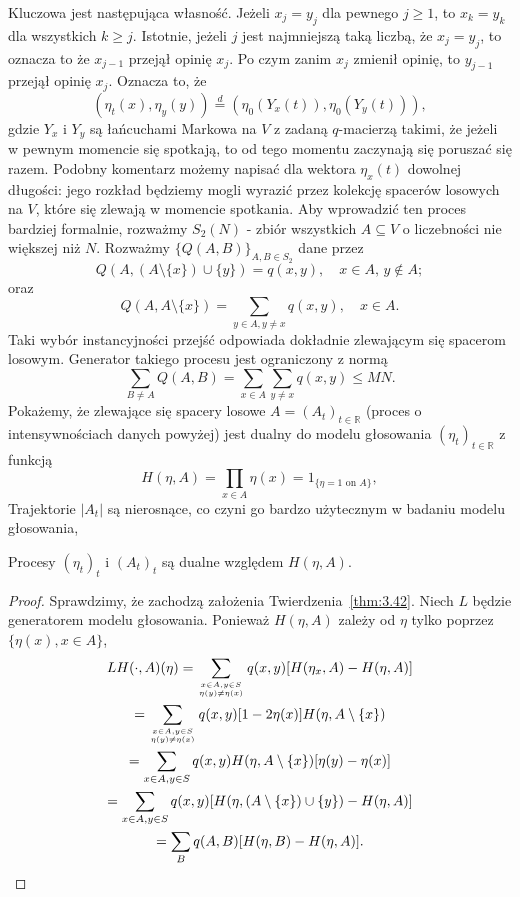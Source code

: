 \documentclass{article}
\begin{document}
Kluczowa jest następująca własność. Jeżeli $x_j=y_j$ dla pewnego $j\geq 1$, to $x_k=y_k$ dla 
wszystkich $k \geq j$. Istotnie, jeżeli $j$ jest najmniejszą taką liczbą, że
$x_j=y_j$, to oznacza to że $x_{j-1}$ przejął opinię $x_j$. Po czym zanim $x_j$ zmienił opinię, to
$y_{j-1}$ przejął opinię $x_j$.
Oznacza to, że
\begin{equation*}
	(\eta_t(x), \eta_y(y)) \stackrel{d}{=} (\eta_0(Y_x(t)), \eta_0(Y_y(t))),
\end{equation*}
gdzie $Y_x$ i $Y_y$ są łańcuchami Markowa na $V$ z zadaną $q$-macierzą takimi, że
jeżeli w pewnym momencie się spotkają, to od tego momentu zaczynają się poruszać się razem. 
Podobny komentarz możemy napisać dla wektora $\eta_x(t)$ dowolnej długości: jego rozkład będziemy
mogli wyrazić przez kolekcję spacerów losowych na $V$, które się zlewają w momencie spotkania.
Aby wprowadzić ten proces bardziej formalnie, rozważmy $S_2(N)$ - zbiór wszystkich
$A \subseteq V$ o liczebności nie większej niż $N$. Rozważmy $\{Q(A,B)\}_{A,B \in S_2}$ dane przez
\[
Q(A, (A \setminus \{x\}) \cup \{y\}) = q(x, y), \quad x \in A, \, y \notin A;
\]
oraz
\[
Q(A, A \setminus \{x\}) = \sum_{y \in A, y \neq x} q(x, y), \quad x \in A.
\]
Taki wybór instancyjności przejść odpowiada dokładnie zlewającym się spacerom losowym.
Generator  takiego procesu jest ograniczony z normą
\[
	\sum_{B \neq A} Q(A, B) = \sum_{x \in A} \sum_{y \neq x} q(x, y) \leq M N.
\]
Pokażemy, że zlewające się spacery losowe $A=(A_t)_{t \in\mathbb{R}}$ 
(proces o intensywnościach danych powyżej)
jest dualny do modelu głosowania $(\eta_t)_{t \in \mathbb{R}}$ z funkcją
\[
H(\eta, A) = \prod_{x \in A} \eta(x) = 1_{\{\eta = 1 \text{ on } A\}},
\]
Trajektorie $|A_t|$ są nierosnące, co czyni go bardzo użytecznym w badaniu modelu głosowania, 

\begin{thm}\label{thm:4.32}
	Procesy $(\eta_t)_t$ i $(A_t)_t$ są dualne względem $H(\eta, A)$.
\end{thm}
\begin{proof}
	Sprawdzimy, że zachodzą założenia Twierdzenia~\ref{thm:3.42}.
	Niech $L$ będzie generatorem modelu głosowania. Ponieważ $H(\eta, A)$ zależy od $\eta$ 
	tylko poprzez $\{\eta(x), x \in A\}$,
	\begin{multline}
		L H(\cdot, A)(\eta) 
		= \sum_{x \in A, y \in S \atop \eta(y) \neq \eta(x)} 
			q(x, y) [H(\eta_x, A) - H(\eta, A)]\\
		= \sum_{x \in A, y \in S \atop \eta(y) \neq \eta(x)} 
			q(x, y) [1 - 2\eta(x)] H(\eta, A \setminus \{x\})\\
		= \sum_{x \in A, y \in S} 
			q(x, y) H(\eta, A \setminus \{x\}) [\eta(y) - \eta(x)]\\
		= \sum_{x \in A, y \in S} 
			q(x, y) [H(\eta, (A \setminus \{x\}) \cup \{y\}) - H(\eta, A)]\\
		= \sum_{B} q(A, B) [H(\eta, B) - H(\eta, A)].
	\end{multline}
\end{proof}
\end{document}
